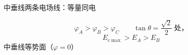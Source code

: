 中垂线\unclear{/}两条电场线：等量同电

\begin{keybox}
\quad{} %
\end{keybox}

\[
\varphi_A>\varphi_B>\varphi_C\qquad \tan\theta=\frac{\sqrt{2}}{2}\ \text{处，}
\]
\[
E_{c\max}>E_A>E_B
\]
中垂线等势面（$\varphi=0$）
